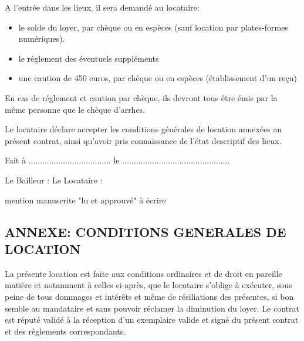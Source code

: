 \documentclass[a4paper,11pt]{article}
\begin{document}
\vspace{0.5cm}

A l'entrée dans les lieux, il sera demandé au locataire:
\begin{itemize}
\item le solde du loyer, par chèque ou en espèces (sauf location par plates-formes numériques).
\item le réglement des éventuels suppléments
\item une caution de 450 euros, par chèque ou en espèces (établissement d'un reçu)
\end{itemize}
En cas de réglement et caution par chèque, ils devront tous être émis par la même personne que le chèque d'arrhes.

\vspace{0.5cm}

Le locataire déclare accepter les conditions générales de location annexées au présent contrat, ainsi qu'avoir pris connaissance de l'état descriptif des lieux.

\vspace{0.5cm}

Fait à .................................... le ...............................................

\vspace{0.5cm}

Le Bailleur : \hspace{3cm}Le Locataire : 

\hspace{5.2cm}mention manuscrite "lu et approuvé" à écrire


\newpage{}




\begin{center}
\section*  { ANNEXE: CONDITIONS GENERALES  DE LOCATION}
\end{center}


\tiny



La présente location est faite aux conditions ordinaires et de droit en pareille matière et notamment à celles ci-après, que le locataire s’oblige à exécuter, sous peine de tous dommages et intérêts et même de résiliations des présentes, si bon semble au mandataire et sans pouvoir réclamer la diminution du loyer.
Le contrat est réputé validé à la réception d’un exemplaire valide et signé du présent contrat et des règlements correspondants.
\end{document}
